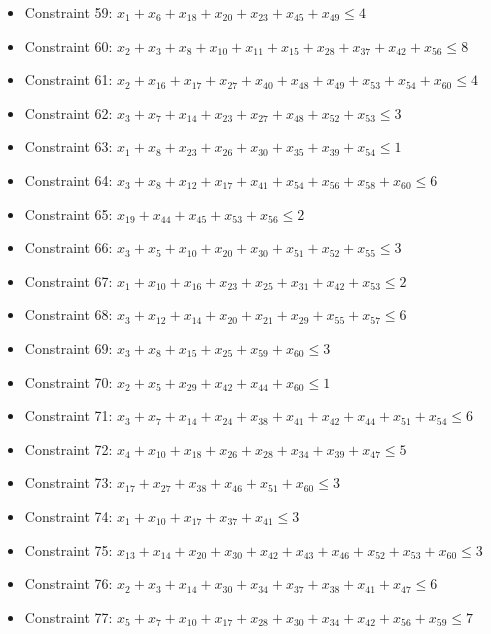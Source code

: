 \documentclass[11pt]{article}
\begin{document}
\begin{itemize}
\item Constraint 59: $x_{1} + x_{6} + x_{18} + x_{20} + x_{23} + x_{45} + x_{49} \le 4$
\item Constraint 60: $x_{2} + x_{3} + x_{8} + x_{10} + x_{11} + x_{15} + x_{28} + x_{37} + x_{42} + x_{56} \le 8$
\item Constraint 61: $x_{2} + x_{16} + x_{17} + x_{27} + x_{40} + x_{48} + x_{49} + x_{53} + x_{54} + x_{60} \le 4$
\item Constraint 62: $x_{3} + x_{7} + x_{14} + x_{23} + x_{27} + x_{48} + x_{52} + x_{53} \le 3$
\item Constraint 63: $x_{1} + x_{8} + x_{23} + x_{26} + x_{30} + x_{35} + x_{39} + x_{54} \le 1$
\item Constraint 64: $x_{3} + x_{8} + x_{12} + x_{17} + x_{41} + x_{54} + x_{56} + x_{58} + x_{60} \le 6$
\item Constraint 65: $x_{19} + x_{44} + x_{45} + x_{53} + x_{56} \le 2$
\item Constraint 66: $x_{3} + x_{5} + x_{10} + x_{20} + x_{30} + x_{51} + x_{52} + x_{55} \le 3$
\item Constraint 67: $x_{1} + x_{10} + x_{16} + x_{23} + x_{25} + x_{31} + x_{42} + x_{53} \le 2$
\item Constraint 68: $x_{3} + x_{12} + x_{14} + x_{20} + x_{21} + x_{29} + x_{55} + x_{57} \le 6$
\item Constraint 69: $x_{3} + x_{8} + x_{15} + x_{25} + x_{59} + x_{60} \le 3$
\item Constraint 70: $x_{2} + x_{5} + x_{29} + x_{42} + x_{44} + x_{60} \le 1$
\item Constraint 71: $x_{3} + x_{7} + x_{14} + x_{24} + x_{38} + x_{41} + x_{42} + x_{44} + x_{51} + x_{54} \le 6$
\item Constraint 72: $x_{4} + x_{10} + x_{18} + x_{26} + x_{28} + x_{34} + x_{39} + x_{47} \le 5$
\item Constraint 73: $x_{17} + x_{27} + x_{38} + x_{46} + x_{51} + x_{60} \le 3$
\item Constraint 74: $x_{1} + x_{10} + x_{17} + x_{37} + x_{41} \le 3$
\item Constraint 75: $x_{13} + x_{14} + x_{20} + x_{30} + x_{42} + x_{43} + x_{46} + x_{52} + x_{53} + x_{60} \le 3$
\item Constraint 76: $x_{2} + x_{3} + x_{14} + x_{30} + x_{34} + x_{37} + x_{38} + x_{41} + x_{47} \le 6$
\item Constraint 77: $x_{5} + x_{7} + x_{10} + x_{17} + x_{28} + x_{30} + x_{34} + x_{42} + x_{56} + x_{59} \le 7$

\end{itemize}
\end{document}
